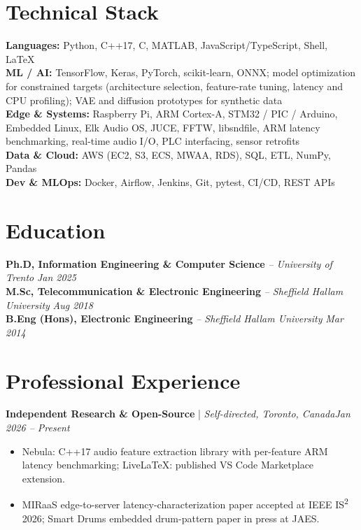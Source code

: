 \documentclass[11pt]{article}
\newenvironment{cvrole}[5]{%
  \par\noindent\textbf{\large #1} | \textit{\small #2, #3}\hfill \textit{\small #4 -- #5}\par
  \begin{itemize}[leftmargin=2em, itemsep=-0.3em, topsep=-0.5em]%
}{%
  \end{itemize}\par\noindent\mbox{}\par\vspace{0.1em}%
}
\begin{document}
\section*{Technical Stack}

\textbf{Languages:} Python, C++17, C, MATLAB, JavaScript/TypeScript, Shell, LaTeX\\
\textbf{ML / AI:} TensorFlow, Keras, PyTorch, scikit-learn, ONNX; model optimization for constrained targets (architecture selection, feature-rate tuning, latency and CPU profiling); VAE and diffusion prototypes for synthetic data\\
\textbf{Edge \& Systems:} Raspberry Pi, ARM Cortex-A, STM32 / PIC / Arduino, Embedded Linux, Elk Audio OS, JUCE, FFTW, libsndfile, ARM latency benchmarking, real-time audio I/O, PLC interfacing, sensor retrofits\\
\textbf{Data \& Cloud:} AWS (EC2, S3, ECS, MWAA, RDS), SQL, ETL, NumPy, Pandas\\
\textbf{Dev \& MLOps:} Docker, Airflow, Jenkins, Git, pytest, CI/CD, REST APIs

\section*{Education}
\textbf{Ph.D, Information Engineering \& Computer Science} \textit{\small{-- University of Trento}} \hfill \textit{Jan 2025}\\[2pt]
\noindent\textbf{M.Sc, Telecommunication \& Electronic Engineering} \textit{\small{-- Sheffield Hallam University}} \hfill \textit{Aug 2018}\\[2pt]
\noindent\textbf{B.Eng (Hons), Electronic Engineering} \textit{\small{-- Sheffield Hallam University}} \hfill \textit{Mar 2014}

\section*{Professional Experience}

\begin{cvrole}{Independent Research \& Open-Source}{Self-directed}{Toronto, Canada}{Jan 2026}{Present}
    \item Nebula: C++17 audio feature extraction library with per-feature ARM latency benchmarking; LiveLaTeX: published VS Code Marketplace extension.
    \item MIRaaS edge-to-server latency-characterization paper accepted at IEEE IS\textsuperscript{2} 2026; Smart Drums embedded drum-pattern paper in press at JAES.
\end{cvrole}
\end{document}
